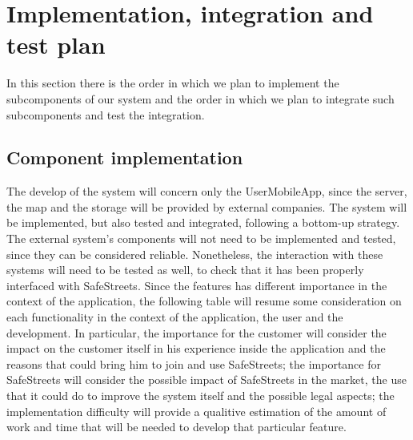 \documentclass[../RASD.tex]{subfiles}
\begin{document}
    \chapter{Implementation, integration and test plan}\label{ch:implementation,-integration-and-test-plan}
    In this section there is the order in which we plan to implement the subcomponents of our system and the order in which we plan to integrate such subcomponents and test the integration.
    \newpage
    \section{Component implementation}\label{sec:component-implementation}
    The develop of the system will concern only the UserMobileApp, since the server, the map and the storage will be provided by external companies. The system will be implemented, but also tested and integrated, following a bottom-up strategy.
    The external system’s components will not need to be implemented and tested, since they can be considered reliable. Nonetheless, the interaction with these systems will need to be tested as well, to check that it has been properly interfaced with SafeStreets.
    Since the features has different importance in the context of the application, the following table will resume some consideration on each functionality in the context of the application, the user and the development. In particular, the importance for the customer will consider the impact on the customer itself in his experience inside the application and the reasons that could bring him to join and use SafeStreets; the importance for SafeStreets will consider the possible impact of SafeStreets in the market, the use that it could do to improve the system itself and the possible legal aspects; the implementation difficulty will provide a qualitive estimation of the amount of work and time that will be needed to develop that particular feature.
    \newpage
\end{document}
